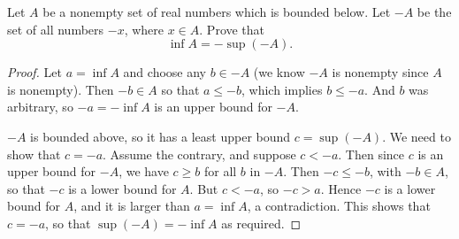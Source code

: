  Let $A$ be a nonempty set of real numbers which is bounded
below. Let $-A$ be the set of all numbers $-x$, where $x\in A$. Prove
that
\begin{equation*}
  \inf A = -\sup(-A).
\end{equation*}
\begin{proof}
  Let $a = \inf A$ and choose any $b\in-A$ (we know $-A$ is nonempty
  since $A$ is nonempty). Then $-b\in A$ so that $a\leq-b$, which
  implies $b\leq-a$. And $b$ was arbitrary, so $-a = -\inf A$ is an upper bound
  for $-A$.

  $-A$ is bounded above, so it has a least upper bound $c =
  \sup(-A)$. We need to show that $c = -a$. Assume the contrary, and
  suppose $c < -a$. Then since $c$ is an upper bound for $-A$, we have
  $c\geq b$ for all $b$ in $-A$. Then $-c\leq-b$, with $-b\in A$, so
  that $-c$ is a lower bound for $A$. But $c < -a$, so $-c > a$. Hence
  $-c$ is a lower bound for $A$, and it is larger than $a = \inf A$, a
  contradiction. This shows that $c = -a$, so that
  $\sup(-A) = -\inf A$ as required.
\end{proof}





